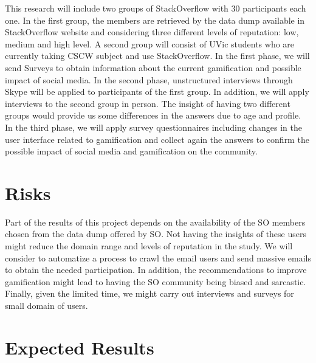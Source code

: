 \documentclass{sigchi}
\begin{document}
This research will include two groups of StackOverflow with 30 participants
each one. In the first group, the members are retrieved by the data dump
available in StackOverflow website and considering three different levels of
reputation: low, medium and high level. A second group will consist of UVic
students who are currently taking CSCW subject and use StackOverflow. In the
first phase, we will send Surveys to obtain information about the current
gamification and possible impact of social media. In the second phase,
unstructured interviews through Skype will be applied to participants of the
first group. In addition, we will apply interviews to the second group in
person. The insight of having two different groups would provide us some
differences in the answers due to age and profile. In the third phase, we will
apply survey questionnaires including changes in the user interface related to
gamification and collect again the answers to confirm the possible impact of
social media and gamification on the community.


\section{Risks}

Part of the results of this project depends on the availability of the SO
members chosen from the data dump offered by SO. Not having the insights of
these users might reduce the domain range and levels of reputation in the
study. We will consider to automatize a process to crawl the email users and
send massive emails to obtain the needed participation. In addition, the
recommendations to improve gamification might lead to having the SO community
being biased and sarcastic. Finally, given the limited time, we might carry out
interviews and surveys for small domain of users.


\section{Expected Results}
\end{document}
